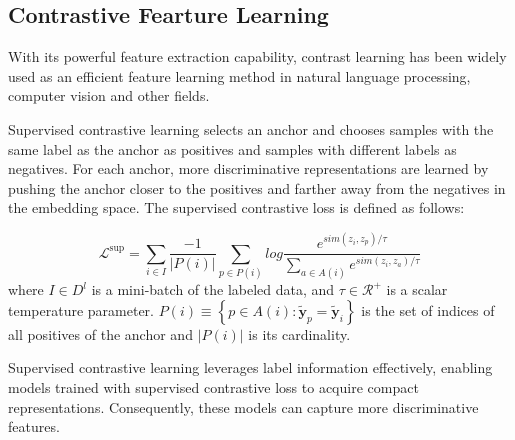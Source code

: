 \documentclass[lettersize,journal]{IEEEtran}
\begin{document}
\subsection{Contrastive Fearture Learning}%

With its powerful feature extraction capability, contrast learning has been widely used as an efficient feature learning method in natural language processing\cite{gunel2020supervised,inoue2020semi}, computer vision\cite{Wang_2021_CVPR,li2021dual} and other fields. 

Supervised contrastive learning selects an anchor and chooses samples with the same label as the anchor as positives and samples with different labels as negatives. For each anchor, more discriminative representations are learned by pushing the anchor closer to the positives and farther away from the negatives in the embedding space\cite{khosla2020supervised}. The supervised contrastive loss is defined as follows:

\begin{equation}
    \mathcal{L}^\text{sup} = \sum_{i \in I} \frac{-1}{|P(i)|} \sum_{p \in P(i)} log \frac{e^{sim({z_i}, {z_p}) / \tau}}{\sum_{a \in A(i)}
    e^{sim({z_i}, {z_a})/\tau} }
    \label{losssup}
\end{equation}
where $I \in D^l$ is a mini-batch of the labeled data, and $\tau \in \mathcal{R}^{+}$ is a scalar temperature parameter. $P(i)\equiv\left\{p \in A(i): \tilde{\boldsymbol{y}}_p=\tilde{\boldsymbol{y}}_i\right\}$ is the set of indices of all positives of the anchor and $|P(i)|$ is its cardinality. 

Supervised contrastive learning leverages label information effectively, enabling models trained with supervised contrastive loss to acquire compact representations. Consequently, these models can capture more discriminative features. 
\end{document}
